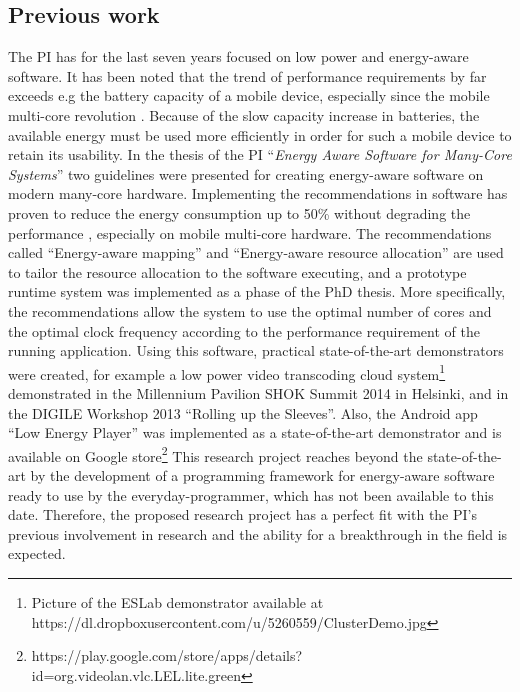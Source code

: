 \documentclass{article}
\begin{document}
\subsection{Previous work}
The PI has for the last seven years focused on low power and energy-aware software. 
It has been noted that the trend of performance requirements by far exceeds e.g the battery capacity of a mobile device, especially since the mobile multi-core revolution \cite{BatteryCapacity,CPUCapacity}. 
Because of the slow capacity increase in batteries, the available energy must be used more efficiently in order for such a mobile device to retain its usability.
In the thesis of the PI ``\textit{Energy Aware Software for Many-Core Systems}'' two guidelines were presented for creating energy-aware software on modern many-core hardware. 
Implementing the recommendations in software has proven to reduce the energy consumption up to 50\% without degrading the performance \cite{HolmbackaHipeac}, especially on mobile multi-core hardware. 
The recommendations called ``Energy-aware mapping'' and ``Energy-aware resource allocation'' are used to tailor the resource allocation to the software executing, 
and a prototype runtime system was implemented as a phase of the PhD thesis.
More specifically, the recommendations allow the system to use the optimal number of cores and the optimal clock frequency according to the performance requirement of the running application.
Using this software, practical state-of-the-art demonstrators were created, for example a low power video transcoding cloud system\footnote{Picture of the ESLab demonstrator available at https://dl.dropboxusercontent.com/u/5260559/ClusterDemo.jpg} demonstrated in the Millennium Pavilion SHOK Summit 2014 in Helsinki, and in the DIGILE Workshop 2013 ``Rolling up the Sleeves''.
Also, the Android app ``Low Energy Player'' was implemented as a state-of-the-art demonstrator and is available on Google store\footnote{https://play.google.com/store/apps/details?id=org.videolan.vlc.LEL.lite.green}
This research project reaches beyond the state-of-the-art by the development of a programming framework for energy-aware software ready to use by the everyday-programmer, 
which has not been available to this date.
Therefore, the proposed research project has a perfect fit with the PI's previous involvement in research and the ability for a breakthrough in the field is expected.
\end{document}
